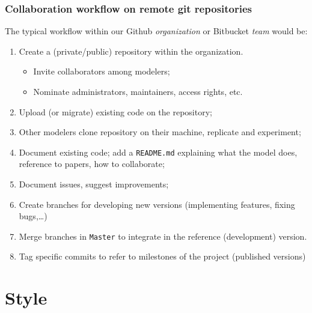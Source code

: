 \documentclass[10pt,svgnames,handout]{beamer}
\begin{document}
\begin{frame}
\frametitle{Collaboration workflow on remote git repositories}
The typical workflow within our Github \emph{organization} or Bitbucket \emph{team} would be:
\begin{enumerate}[<+->]
  \item Create a (private/public) repository within the organization.
  \begin{itemize}
    \item Invite collaborators among modelers;
    \item Nominate administrators, maintainers, access rights, etc.
  \end{itemize}
  \item Upload (or migrate) existing code on the repository;
  \item Other modelers clone repository on their machine, replicate and experiment;
  \item Document existing code; add a \texttt{README.md} explaining what the model does, reference to papers, how to collaborate;
  \item Document issues, suggest improvements;
  \item Create branches for developing new versions (implementing features, fixing bugs,\ldots)
  \item Merge branches in \texttt{Master} to integrate in the reference (development) version.
  \item Tag specific commits to refer to milestones of the project (published versions)
\end{enumerate}

\end{frame}



\section{Style}
\end{document}
